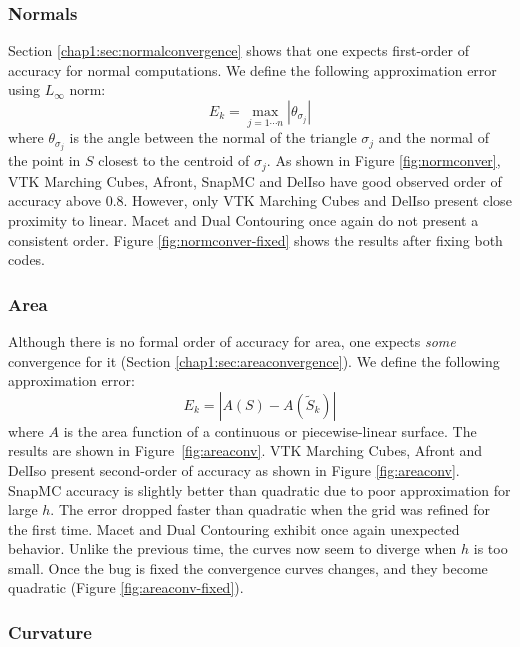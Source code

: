 \subsubsection{Normals}
\label{subchap1:sec:normal-convergence}

Section \ref{chap1:sec:normalconvergence} shows that 
one expects first-order of accuracy for normal computations. 
We define the following approximation error using $L_\infty$ norm:
\begin{equation}
E_{k} = \max_{j=1\cdots n}|\theta_{\sigma_j}|
\label{eq:normerror}
\end{equation}
where $\theta_{\sigma_j}$ is the angle between the normal of 
the triangle $\sigma_j$ and the normal of 
the point in $S$ closest to the centroid of $\sigma_j$.
As shown in Figure \ref{fig:normconver}, VTK Marching Cubes, Afront,
SnapMC and DelIso have good observed order of accuracy above $0.8$. However, only 
VTK Marching Cubes and DelIso present close proximity to linear. 
Macet and Dual Contouring once again do not present a consistent order. 
Figure \ref{fig:normconver-fixed} shows the results after fixing both codes.

\subsubsection{Area}
\label{chap1:sec:area-observed-order-of-accuracy}

Although there is no formal order of accuracy for area, one expects \emph{some}
convergence for it (Section \ref{chap1:sec:areaconvergence}).
We define the following approximation error:
\begin{equation}
E_{k} = |A(S) - A(\tilde{S}_k)|
\label{eq:surfareaerror}
\end{equation}
where $A$ is the area function of a continuous or piecewise-linear surface. 
The results are shown in Figure~\ref{fig:areaconv}. 
VTK Marching Cubes, Afront and DelIso present second-order of accuracy as shown 
in Figure \ref{fig:areaconv}. SnapMC accuracy is slightly better than quadratic due 
to poor approximation for large $h$. The error dropped faster than quadratic when the 
grid was refined for the first time. Macet and Dual Contouring exhibit once again  
unexpected behavior. Unlike the previous time, the curves now seem to diverge 
when $h$ is too small. Once the bug is fixed the convergence curves changes,
and they become quadratic (Figure \ref{fig:areaconv-fixed}).
 
\subsubsection{Curvature}


